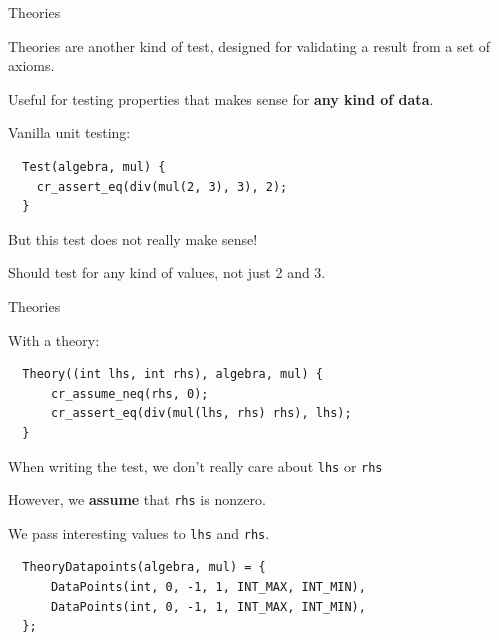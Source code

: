 \documentclass[10pt]{beamer}
\begin{document}
\begin{frame}[fragile]{Theories}

  Theories are another kind of test, designed for validating a result from
  a set of axioms.

  \pause{}

  Useful for testing properties that makes sense for \textbf{any kind of data}.

  \pause{}

  Vanilla unit testing:

  \begin{lstlisting}
  Test(algebra, mul) {
    cr_assert_eq(div(mul(2, 3), 3), 2);
  }
  \end{lstlisting}

  But this test does not really make sense!

  Should test for any kind of values, not just 2 and 3.

\end{frame}

\begin{frame}[fragile]{Theories}

  With a theory:

  \begin{lstlisting}
  Theory((int lhs, int rhs), algebra, mul) {
      cr_assume_neq(rhs, 0);
      cr_assert_eq(div(mul(lhs, rhs) rhs), lhs);
  }
  \end{lstlisting}

  \pause{}

  When writing the test, we don't really care about \verb|lhs| or \verb|rhs|

  \pause{}

  However, we \textbf{assume} that \verb|rhs| is nonzero.

  \pause{}

  We pass interesting values to \verb|lhs| and \verb|rhs|.

  \begin{lstlisting}
  TheoryDatapoints(algebra, mul) = {
      DataPoints(int, 0, -1, 1, INT_MAX, INT_MIN),
      DataPoints(int, 0, -1, 1, INT_MAX, INT_MIN),
  };
  \end{lstlisting}

\end{frame}

\end{document}
